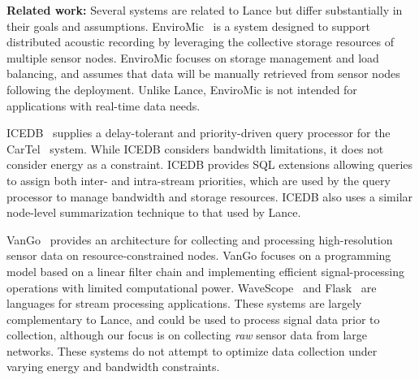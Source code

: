 {\bf Related work:}
Several systems are related to Lance but differ substantially in their
goals and assumptions.  EnviroMic~\cite{enviromic} is a system
designed to support distributed acoustic recording by leveraging the 
collective storage resources of multiple sensor nodes. 
EnviroMic focuses on storage management and load balancing, and
assumes that data will be manually retrieved from sensor nodes
following the deployment. Unlike Lance, EnviroMic is not intended 
for applications with real-time data needs.

ICEDB~\cite{zhang2007icedb} supplies a delay-tolerant and priority-driven
query processor for the CarTel~\cite{cartel} system. While ICEDB
considers bandwidth limitations, it does not consider energy as a
constraint. ICEDB provides SQL extensions allowing queries to assign
both inter- and intra-stream priorities, which are used by the query
processor to manage bandwidth and storage resources. ICEDB also uses a
similar node-level summarization technique to that used by Lance. 

VanGo~\cite{vango} provides an architecture for collecting and processing
high-resolution sensor data on resource-constrained nodes.  VanGo focuses on a
programming model based on a linear filter chain and implementing efficient
signal-processing operations with limited computational power.
WaveScope~\cite{wavescope} and Flask~\cite{flask-tr} are languages for stream
processing applications.  These systems are largely complementary to Lance,
and could be used to process signal data prior to collection, although our
focus is on collecting {\em raw} sensor data from large networks.  These
systems do not attempt to optimize data collection under varying energy and
bandwidth constraints. 

%





